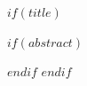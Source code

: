 $if(title)$
\begin{frame}
  \titlepage
\end{frame}
$if(abstract)$
\begin{abstract}
$abstract$
\end{abstract}
$endif$
$endif$
